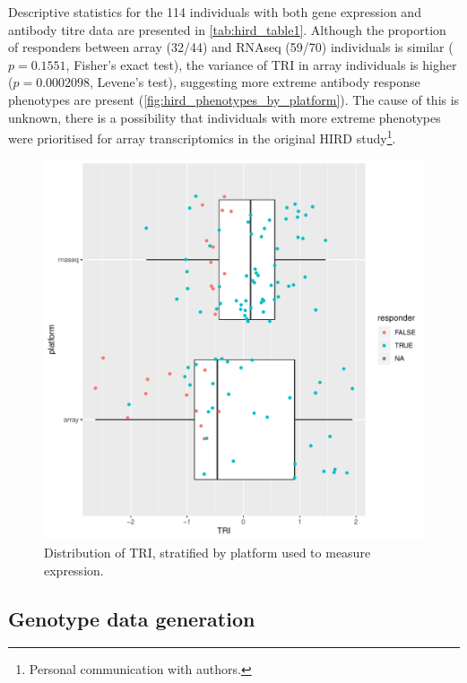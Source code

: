 Descriptive statistics for the 114 individuals with both gene expression and antibody titre data are presented in \autoref{tab:hird_table1}.
Although the proportion of responders between array (32/44) and \gls{RNAseq} (59/70) individuals is similar ($p = 0.1551$, Fisher's exact test), the variance of \gls{TRI} in array individuals is higher ($p = 0.0002098$, Levene's test), suggesting more extreme antibody response phenotypes are present (\autoref{fig:hird_phenotypes_by_platform}).
The cause of this is unknown, there is a possibility that individuals with more extreme phenotypes were prioritised for array transcriptomics in the original \gls{HIRD} study\footnote{Personal communication with authors.}.



\begin{figure}
    \includegraphics[width=1.0\textwidth,page=1]{mainmatter/figures/chapter_02/compare_phenotype_by_platform.pheno_boxplots.pdf}
    \caption{Distribution of \gls{TRI}, stratified by platform used to measure expression.}
    \label{fig:hird_phenotypes_by_platform}
\end{figure}

\subsection{Genotype data generation}

